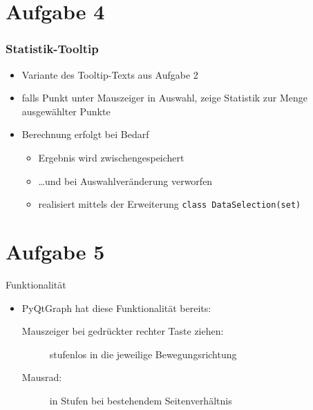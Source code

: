 \documentclass{beamer}
\begin{document}
    \section{Aufgabe 4}
    \begin{frame}[containsverbatim]
    	\frametitle{Statistik-Tooltip}
    	\begin{itemize}
    		\item Variante des Tooltip-Texts aus Aufgabe 2
    		\item falls Punkt unter Mauszeiger in Auswahl, zeige Statistik zur Menge ausgewählter Punkte
    		\item Berechnung erfolgt bei Bedarf
    			\begin{itemize}
    				\item Ergebnis wird zwischengespeichert
    				\item \ldots und bei Auswahlveränderung verworfen
    				\item realisiert mittels der Erweiterung \lstinline{class DataSelection(set)}
    			\end{itemize}
    	\end{itemize}
    \end{frame}

    \section{Aufgabe 5}
    \begin{frame}{Funktionalität}
    	\begin{itemize}
    		\setlength\itemsep{1em}
    		\item PyQtGraph hat diese Funktionalität bereits:
		  		\begin{description}
						\item[Mauszeiger bei gedrückter rechter Taste ziehen:] stufenlos in die jeweilige Bewegungsrichtung
						\item[Mausrad:] in Stufen bei bestehendem Seitenverhältnis
					\end{description}
    	\end{itemize}
    \end{frame}
\end{document}
